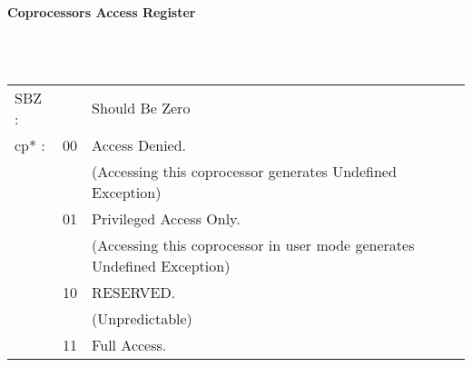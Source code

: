 \begin{minipage}{\textwidth}
\begin{framed}
	\begin{center}
		\textbf{Coprocessors Access Register}
	\end{center}
	\begin{bytefield}[bitwidth=10px,endianness=big]{32}
		\\
			\small{}\\
	\end{bytefield}
	\begin{tabular}{p{1cm}p{0.5cm}p{12cm}}
	SBZ : & & Should Be Zero \\
	cp* : & 00 & Access Denied. \\
	&    & \scriptsize(Accessing this coprocessor generates Undefined Exception)\\
	& 01 & Privileged Access Only. \\
	&    & \scriptsize (Accessing this coprocessor in user mode generates Undefined Exception)\\
	& 10 & RESERVED. \\
	&    & \scriptsize (Unpredictable)\\
	& 11 & Full Access.\\
	\end{tabular} \\
\end{framed}
\end{minipage}